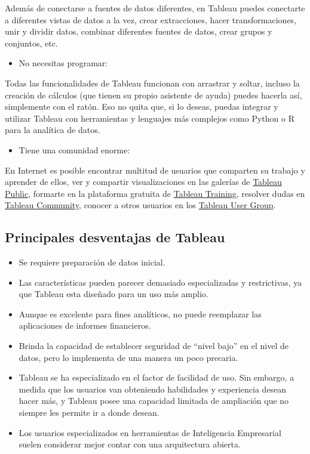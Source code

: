 \documentclass[
]{book}
\providecommand{\tightlist}{%
  \setlength{\itemsep}{0pt}\setlength{\parskip}{0pt}}
\begin{document}
Además de conectarse a fuentes de datos diferentes, en Tableau puedes conectarte a diferentes vistas de datos a la vez, crear extracciones, hacer transformaciones, unir y dividir datos, combinar diferentes fuentes de datos, crear grupos y conjuntos, etc.

\begin{itemize}
\tightlist
\item
  No necesitas programar:
\end{itemize}

Todas las funcionalidades de Tableau funcionan con arrastrar y soltar, incluso la creación de cálculos (que tienen su propio asistente de ayuda) puedes hacerla así, simplemente con el ratón.
Eso no quita que, si lo deseas, puedas integrar y utilizar Tableau con herramientas y lenguajes más complejos como Python o R para la analítica de datos.

\begin{itemize}
\tightlist
\item
  Tiene una comunidad enorme:
\end{itemize}

En Internet es posible encontrar multitud de usuarios que comparten su trabajo y aprender de ellos, ver y compartir visualizaciones en las galerías de \href{https://public.tableau.com/en-us/s/}{Tableau Public}, formarte en la plataforma gratuita de \href{https://www.tableau.com/learn/training/20203}{Tableau Training}, resolver dudas en \href{https://community.tableau.com/s/}{Tableau Community}, conocer a otros usuarios en los \href{https://usergroups.tableau.com/}{Tableau User Group}.

\hypertarget{principales-desventajas-de-tableau}{%
\subsection{Principales desventajas de Tableau}\label{principales-desventajas-de-tableau}}

\begin{itemize}
\tightlist
\item
  Se requiere preparación de datos inicial.
\item
  Las características pueden parecer demasiado especializadas y restrictivas, ya que Tableau esta diseñado para un uso más amplio.
\item
  Aunque es excelente para fines analíticos, no puede reemplazar las aplicaciones de informes financieros.\\
\item
  Brinda la capacidad de establecer seguridad de ``nivel bajo'' en el nivel de datos, pero lo implementa de una manera un poco precaria.
\item
  Tableau se ha especializado en el factor de facilidad de uso. Sin embargo, a medida que los usuarios van obteniendo habilidades y experiencia desean hacer más, y Tableau posee una capacidad limitada de ampliación que no siempre les permite ir a donde desean.
\item
  Los usuarios especializados en herramientas de Inteligencia Empresarial suelen considerar mejor contar con una arquitectura abierta.
\end{itemize}
\end{document}
